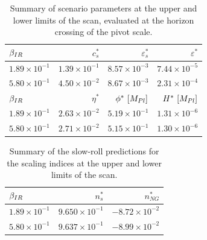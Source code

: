 \begin{table}[h!]
  \begin{center}
    \begin{tabular}{lrrr}
        \toprule
        $\beta_{IR}$ &    $c_s^{*}$ &  $\varepsilon_s^{*}$ &   $\varepsilon^{*}$ \\
        \midrule
        $1.89\times 10^{-1}$  &  $1.39\times 10^{-1}$  &  $  8.57\times 10^{-3}$  &  $7.44\times 10^{-5}$  \\
        $5.80\times 10^{-1}$  &  $4.50\times 10^{-2}$  &  $  8.67\times 10^{-3}$  &  $2.31\times 10^{-4}$  \\
        \bottomrule
        $\beta_{IR}$ &    $\eta^{*}$ &  $\phi^{*}~[M_{Pl}]$ &     $H^{*}~[M_{Pl}]$ \\
        \midrule
        $1.89\times 10^{-1}$  &  $2.63\times 10^{-2}$ &  $5.19\times 10^{-1}$  &  $1.31\times 10^{-6}$\\
        $5.80\times 10^{-1}$  &  $2.71\times 10^{-2}$ &  $5.15\times 10^{-1}$  &  $1.30\times 10^{-6}$\\
        \bottomrule
    \end{tabular}
    \caption{
        Summary of scenario parameters at the upper and lower limits of the scan, evaluated at the horizon
      crossing of the pivot scale.
      }\label{tab:scan_summary_sr}
  \end{center}
\end{table}




\begin{table}[h!]
  \begin{center}
    \begin{tabular}{lrr}
        \toprule
        $\beta_{IR}$ &  $n_s^{*}$ &  $n_{NG}^{*}$\\
        \midrule
        $1.89\times 10^{-1}$  &  $9.650\times 10^{-1}$  &  $-8.72\times 10^{-2}$\\
        $5.80\times 10^{-1}$  &  $9.637\times 10^{-1}$  &  $-8.99\times 10^{-2}$\\
        \bottomrule
    \end{tabular}
      \caption{
          Summary of the slow-roll predictions for the scaling indices
          at the upper and lower limits of the scan.
      }\label{tab:scan_summary_ns}
  \end{center}
\end{table}


